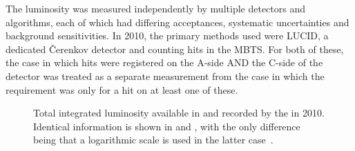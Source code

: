 The luminosity was measured independently by multiple detectors and algorithms,
each of which had differing acceptances, systematic uncertainties and background 
sensitivities. In 2010, the primary methods used were LUCID, a dedicated \v{C}erenkov
detector and counting hits in the MBTS. For both of these, the case in which hits
were registered on the A-side AND the C-side of the detector was treated as a separate
measurement from the case in which the requirement was only for a hit on at least
one of these.

\begin{figure}[htpb]
  \quad
  \caption{Total integrated luminosity available in \ATLAS and recorded by the \LHC in 2010. Identical information is shown in \protect{} and \protect{}, with the only difference being that a logarithmic scale is used in the latter case~\cite{ATLAS-CONF-2011-011}.}
  \label{fig:analysis-tools:luminosity}
\end{figure}

